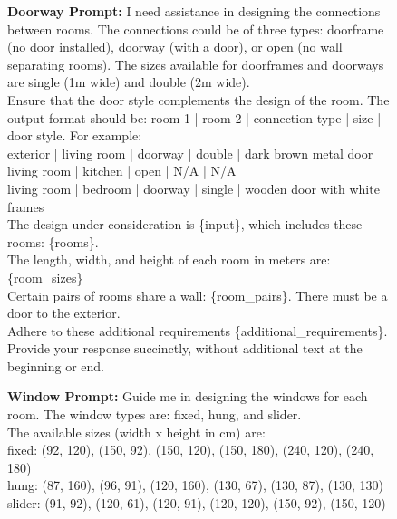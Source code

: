 \begin{figure}[!b]
\begin{center}
    \begin{tcolorbox} [top=2pt,bottom=2pt, width=\linewidth, boxrule=1pt]
    {\footnotesize {\selectfont
    \textbf{Doorway Prompt:}
    I need assistance in designing the connections between rooms. The connections could be of three types: doorframe (no door installed), doorway (with a door), or open (no wall separating rooms). The sizes available for doorframes and doorways are single (1m wide) and double (2m wide). \\
    
    Ensure that the door style complements the design of the room. The output format should be: room 1 | room 2 | connection type | size | door style.
    For example: \\
    exterior | living room | doorway | double | dark brown metal door \\
    living room | kitchen | open | N/A | N/A \\
    living room | bedroom | doorway | single | wooden door with white frames \\
    
    The design under consideration is \{input\}, which includes these rooms: \{rooms\}. \\
    The length, width, and height of each room in meters are:
    \{room\_sizes\} \\
    Certain pairs of rooms share a wall: \{room\_pairs\}. There must be a door to the exterior. \\
    Adhere to these additional requirements \{additional\_requirements\}. \\
    
    Provide your response succinctly, without additional text at the beginning or end.
    }
    \par}
    \end{tcolorbox}

    \begin{tcolorbox} [top=2pt,bottom=2pt, width=\linewidth, boxrule=1pt]
    {\footnotesize {\selectfont
    \textbf{Window Prompt:}
    Guide me in designing the windows for each room. The window types are: fixed, hung, and slider. \\
    The available sizes (width x height in cm) are: \\
    fixed: (92, 120), (150, 92), (150, 120), (150, 180), (240, 120), (240, 180) \\
    hung: (87, 160), (96, 91), (120, 160), (130, 67), (130, 87), (130, 130) \\
    slider: (91, 92), (120, 61), (120, 91), (120, 120), (150, 92), (150, 120) \\
    
}}
\end{tcolorbox}
\end{center}
\end{figure}
